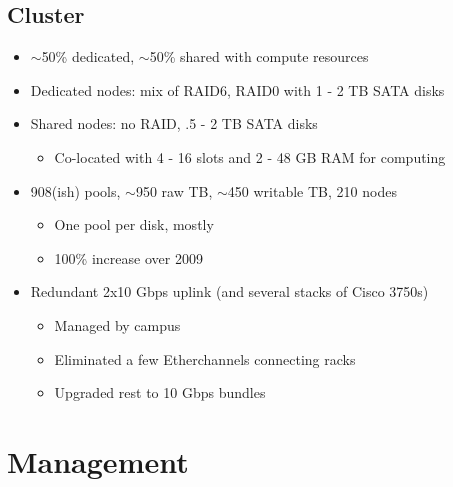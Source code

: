 \documentclass{beamer}
\newcommand{\ca}{\ensuremath{\sim}}
\begin{document}
\subsection{Cluster}
\begin{frame}
\begin{itemize}
	\item \ca{}50\% dedicated, \ca{}50\% shared with compute resources
	\item Dedicated nodes: mix of RAID6, RAID0 with 1 - 2 TB SATA disks
	\item Shared nodes: no RAID, .5 - 2 TB SATA disks
	\begin{itemize}
		\item Co-located with 4 - 16 slots and 2 - 48 GB RAM for computing
	\end{itemize}
	\item 908(ish) pools, \ca{}950 raw TB, \ca{}450 writable TB, 210 nodes
	\begin{itemize}
		\item One pool per disk, mostly
		\item 100\% increase over 2009
	\end{itemize}
	\item Redundant 2x10 Gbps uplink (and several stacks of Cisco 3750s)
	\begin{itemize}
		\item Managed by campus
		\item Eliminated a few Etherchannels connecting racks
		\item Upgraded rest to 10 Gbps bundles
	\end{itemize}
\end{itemize}
\end{frame}

\section{Management}
\end{document}
